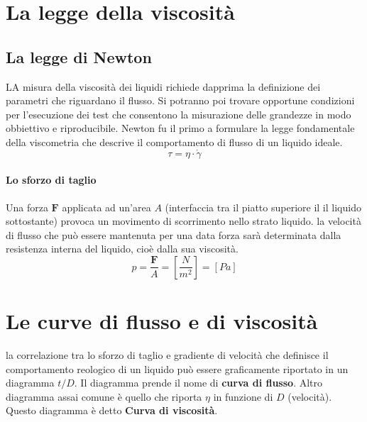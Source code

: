 \section{La legge della viscosità}
\subsection{La legge di Newton}
LA misura della viscosità dei liquidi richiede dapprima la definizione dei parametri che riguardano il flusso. Si potranno poi trovare opportune condizioni per l'esecuzione dei test che consentono la misurazione delle grandezze in modo obbiettivo e riproducibile.
Newton fu il primo a formulare la legge fondamentale della viscometria che descrive il comportamento di flusso di un liquido ideale.
\begin{equation}
\tau = \eta \cdot \dot{\gamma}
\label{eqn:1LeggeNewton}
\end{equation}

\paragraph{Lo sforzo di taglio}
Una forza $\mathbf{F}$ applicata ad un'area $A$ (interfaccia tra il piatto superiore il il liquido sottostante) provoca un movimento di scorrimento nello strato liquido. la velocità di flusso che può essere mantenuta per una data forza sarà determinata dalla resistenza interna del liquido, cioè dalla sua viscosità.
\begin{equation}
p = \frac{\mathbf{F}}{A} = \left[\frac{N}{m^2}\right] = \left[Pa\right]
\end{equation}

\section{Le curve di flusso e di viscosità}
la correlazione tra lo sforzo di taglio e gradiente di velocità che definisce il comportamento reologico di un liquido può essere graficamente riportato in un diagramma $t/D$. Il diagramma prende il nome di \textbf{curva di flusso}.
Altro diagramma assai comune è quello che riporta $\eta$ in funzione di $D$ (velocità). Questo diagramma è detto \textbf{Curva di viscosità}.